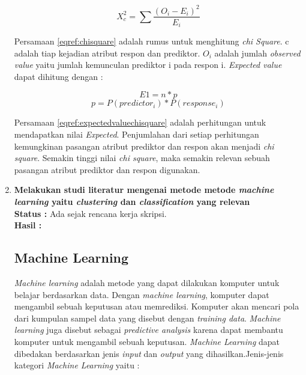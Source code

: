 \documentclass[a4paper,twoside]{article}
\begin{document}
\begin{enumerate}
\begin{equation}
X_{c}^{2} = \sum \frac{(O_i - E_i)^2}{E_i}
\label{eqref:chisquare}
\end{equation}

Persamaan \ref{eqref:chisquare} adalah rumus untuk menghitung \textit{chi Square}. c adalah tiap kejadian atribut respon dan prediktor. $O_i$ adalah jumlah \textit{observed value} yaitu jumlah kemunculan prediktor i pada respon i. \textit{Expected value} dapat dihitung dengan :

\begin{equation}
E1 = n * p 
\end{equation}
\begin{equation}
p = P(predictor_i) * P(response_i) 
\label{eqref:expectedvaluechisquare}
\end{equation}

Persamaan \ref{eqref:expectedvaluechisquare} adalah perhitungan untuk mendapatkan nilai \textit{Expected}. Penjumlahan dari setiap perhitungan kemungkinan pasangan atribut prediktor dan respon akan menjadi \textit{chi square}. Semakin tinggi nilai \textit{chi square}, maka semakin relevan sebuah pasangan atribut prediktor dan respon digunakan.






		\item \textbf{Melakukan studi literatur mengenai metode metode \textit{machine learning} yaitu \textit{clustering} dan \textit{classification} yang relevan}\\
		{\bf Status :} Ada sejak rencana kerja skripsi.\\
		{\bf Hasil :}  \\
		
		\subsection{Machine Learning}
\textit{Machine learning} adalah metode yang dapat dilakukan komputer untuk belajar berdasarkan data. Dengan \textit{machine learning}, komputer dapat mengambil sebuah keputusan atau memrediksi. Komputer akan mencari pola dari kumpulan sampel data yang disebut dengan \textit{training data}. \textit{Machine learning} juga disebut sebagai \textit{predictive analysis} karena dapat membantu komputer untuk mengambil sebuah keputusan. \textit{Machine Learning} dapat dibedakan berdasarkan jenis \textit{input} dan \textit{output} yang dihasilkan.Jenis-jenis kategori \textit{Machine Learning} yaitu :  
		

\end{enumerate}
\end{document}
